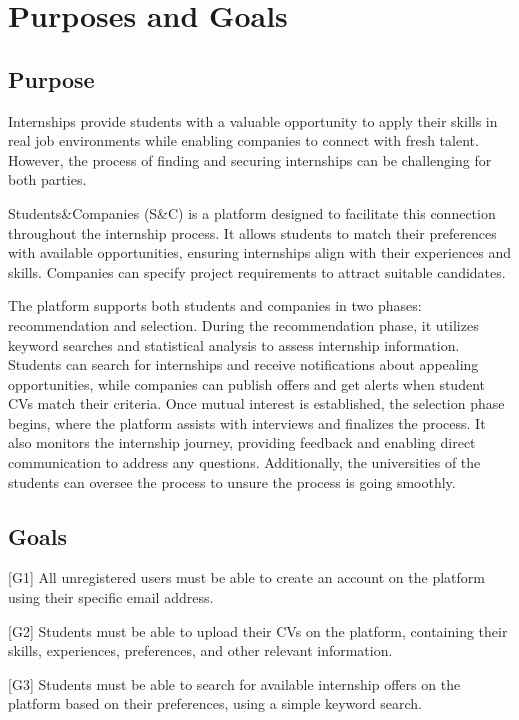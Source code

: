 
\renewcommand{\thesection}{\Alph{section}}
\section{Purposes and Goals}
\label{sec:purposeandgoals}
\subsection{Purpose}
\label{subsec:purpose}
Internships provide students with a valuable opportunity to apply their skills in real job environments while enabling companies to connect with 
fresh talent. However, the process of finding and securing internships can be challenging for both parties.

Students\&Companies (S\&C) is a platform designed to facilitate this connection throughout the internship process. It allows 
students to match their preferences with available opportunities, ensuring internships align with their experiences and skills. 
Companies can specify project requirements to attract suitable candidates.

The platform supports both students and companies in two phases: recommendation and selection. During the recommendation phase, 
it utilizes keyword searches and statistical analysis to assess internship information. Students can search for internships and receive 
notifications about appealing opportunities, while companies can publish offers and get alerts when student CVs match their criteria.
Once mutual interest is established, the selection phase begins, where the platform assists with interviews and finalizes the process. 
It also monitors the internship journey, providing feedback and enabling direct communication to address any questions. Additionally, 
the universities of the students can oversee the process to unsure the process is going smoothly.

\subsection{Goals}
\label{subsec:goals}
[G1] All unregistered users must be able to create an account on the platform using their specific email address.

[G2] Students must be able to upload their CVs on the platform, containing their skills, experiences, preferences, and other relevant information.

[G3] Students must be able to search for available internship offers on the platform based on their preferences, using a simple keyword search.

